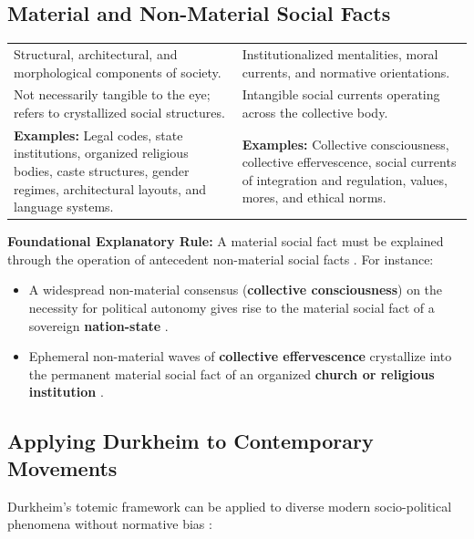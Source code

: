 \subsection{Material and Non-Material Social Facts}

\begin{table}[htbp]
\centering
\small
\begin{tabularx}{\textwidth}{YY}
\toprule
{}
 &  \\
\midrule
Structural, architectural, and morphological components of society. & Institutionalized mentalities, moral currents, and normative orientations. \\
Not necessarily tangible to the eye; refers to crystallized social structures. & Intangible social currents operating across the collective body. \\
\textbf{Examples:} Legal codes, state institutions, organized religious bodies, caste structures, gender regimes, architectural layouts, and language systems. & \textbf{Examples:} Collective consciousness, collective effervescence, social currents of integration and regulation, values, mores, and ethical norms. \\
\bottomrule
\end{tabularx}
\end{table}

\begin{KeyConcept}
\textbf{Foundational Explanatory Rule:}
A material social fact must be explained through the operation of antecedent non-material social facts . For instance:
\begin{itemize}
    \item A widespread non-material consensus (\textbf{collective consciousness}) on the necessity for political autonomy gives rise to the material social fact of a sovereign \textbf{nation-state} .
    \item Ephemeral non-material waves of \textbf{collective effervescence} crystallize into the permanent material social fact of an organized \textbf{church or religious institution} .
\end{itemize}
\end{KeyConcept}

\subsection{Applying Durkheim to Contemporary Movements}

Durkheim's totemic framework can be applied to diverse modern socio-political phenomena without normative bias :

